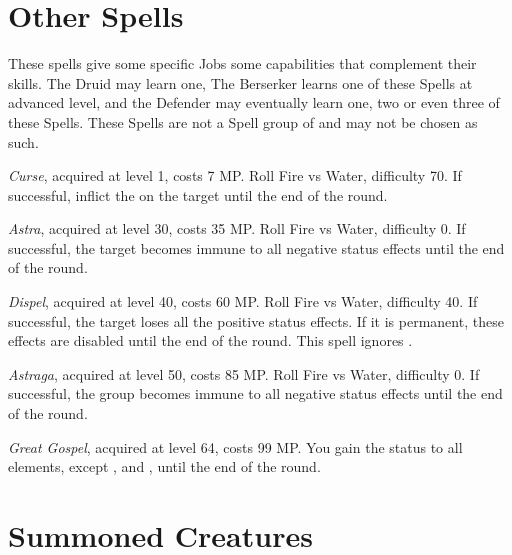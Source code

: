 \section{Other Spells}\label{sec:magic-other}
\begin{multicols}{2}

    These spells give some specific Jobs some capabilities that complement their skills. The Druid may learn one, The Berserker learns one of these Spells at advanced level, and the Defender may eventually learn one, two or even three of these Spells. These Spells are not a Spell group of and may not be chosen as such.
    
    \textit{Curse}, acquired at level 1, costs 7 MP\@. Roll Fire vs Water, difficulty 70. If successful, inflict the  on the target until the end of the round.

    \textit{Astra}, acquired at level 30, costs 35 MP\@. Roll Fire vs Water, difficulty 0. If successful, the target becomes immune to all negative status effects until the end of the round.
    
    \textit{Dispel}, acquired at level 40, costs 60 MP\@. Roll Fire vs Water, difficulty 40. If successful, the target loses all the positive status effects. If it is permanent, these effects are disabled until the end of the round. This spell ignores .
    
    \textit{Astraga}, acquired at level 50, costs 85 MP\@. Roll Fire vs Water, difficulty 0. If successful, the group becomes immune to all negative status effects until the end of the round.
    
    \textit{Great Gospel}, acquired at level 64, costs 99 MP\@. You gain the  status to all elements, except ,  and , until the end of the round.	

\end{multicols}

\section{Summoned Creatures}\label{sec:magic-summoned}

